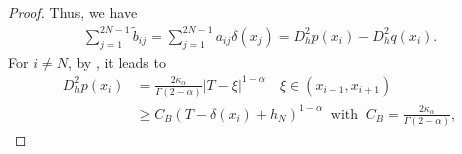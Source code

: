 \documentclass{amsart}
\theoremstyle{definition}
\theoremstyle{remark}
\numberwithin{equation}{section}
\begin{document}
\begin{proof}
  Thus, we have
  \begin{equation*}
    \begin{aligned}
      \sum_{j=1}^{2N-1} \tilde{b}_{ij} =\sum_{j=1}^{2N-1} a_{ij} \delta(x_j)     
       =  D_h^2  p (x_i) -  D_h^2 q(x_i) .
    \end{aligned}
  \end{equation*}
  For \(i \neq N\), by , it leads to
  \begin{equation*}
    \begin{aligned}
      D_h^2 p(x_i) 
            & = \frac{2 \kappa_\alpha}{\Gamma(2-\alpha)} |T - \xi|^{1-\alpha}  \quad \xi \in (x_{i-1}, x_{i+1}) \\
            & \ge C_B (T - \delta(x_{i}) + h_N)^{1-\alpha} \;\; \text{with} \;\; C_B=\frac{2 \kappa_\alpha}{\Gamma(2-\alpha)},
    \end{aligned}
  \end{equation*}

\end{proof}
\end{document}
